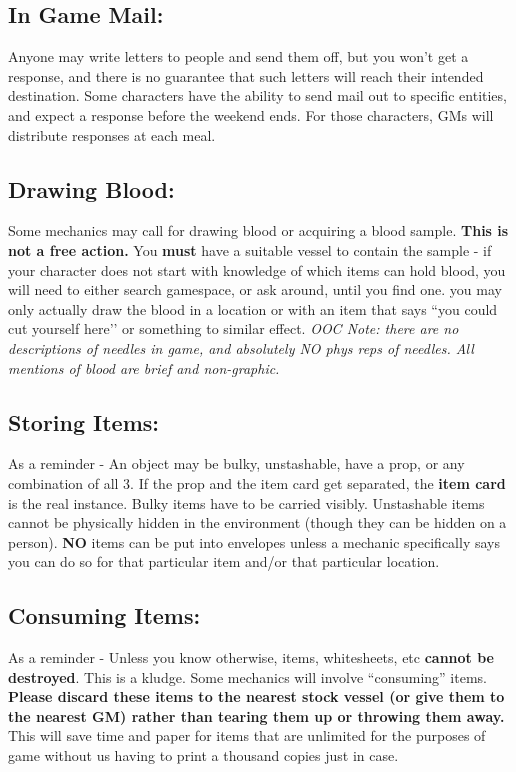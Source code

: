 \documentclass[sheet]{GL2020}
\begin{document}
{{\subsection{In Game Mail:}
Anyone may write letters to people and send them off, but you won't get a response, and there is no guarantee that such letters will reach their intended destination. Some characters have the ability to send mail out to specific entities, and expect a response before the weekend ends. For those characters, GMs will distribute responses at each meal. 

\subsection{Drawing Blood:}
Some mechanics may call for drawing blood or acquiring a blood sample. \textbf{This is not a free action.} You \textbf{must} have a suitable vessel to contain the sample - if your character does not start with knowledge of which items can hold blood, you will need to either search gamespace, or ask around, until you find one. \textbf{\Further} you may only actually draw the blood in a location or with an item that says “you could cut yourself here’’ or something to similar effect. \emph{OOC Note: there are no descriptions of needles in game, and absolutely NO phys reps of needles. All mentions of blood are brief and non-graphic.}

\subsection{Storing Items:}
As a reminder - An object may be bulky, unstashable, have a prop, or any combination of all 3. If the prop and the item card get separated, the \textbf{item card} is the real instance. Bulky items have to be carried visibly. Unstashable items cannot be physically hidden in the environment (though they can be hidden on a person). \textbf{NO} items can be put into envelopes unless a mechanic specifically says you can do so for that particular item and/or that particular location.

\subsection{Consuming Items:}
As a reminder - Unless you know otherwise, items, whitesheets, etc \textbf{cannot be destroyed}. This is a kludge. Some mechanics will involve ``consuming'' items. \textbf{Please discard these items to the nearest stock vessel (or give them to the nearest GM) rather than tearing them up or throwing them away.} This will save time and paper for items that are unlimited for the purposes of game without us having to print a thousand copies just in case.}

}
\end{document}
